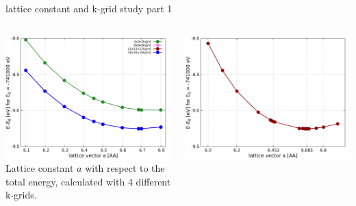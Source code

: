 \begin{frame}{lattice constant and k-grid study part 1}
	\begin{columns}
		\begin{column}{0.48\linewidth}
			\centering
			\includegraphics[width=\linewidth]{andere_bilder/plot_energies_hgte_bulk_all_kgrid_in_one.pdf}
			\\
			Lattice constant $a$ with respect to the total energy, calculated with 4 different k-grids. 
		\end{column}
		\begin{column}{0.48\linewidth}
			\centering
			\includegraphics[width=\linewidth]{andere_bilder/lattice_constant_study_spin_none_no_soc.pdf}
			\\

\end{column}
\end{columns}
\end{frame}
